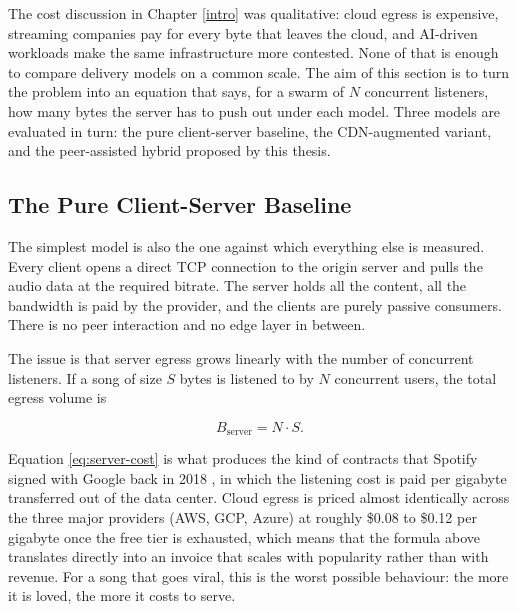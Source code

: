 \indent \par The cost discussion in Chapter \ref{intro} was qualitative: cloud egress is expensive, streaming companies pay for every byte that leaves the cloud, and AI-driven workloads make the same infrastructure more contested. None of that is enough to compare delivery models on a common scale. The aim of this section is to turn the problem into an equation that says, for a swarm of $N$ concurrent listeners, how many bytes the server has to push out under each model. Three models are evaluated in turn: the pure client-server baseline, the CDN-augmented variant, and the peer-assisted hybrid proposed by this thesis.

\subsection{The Pure Client-Server Baseline}
\label{subsec:client-server}

\indent \par The simplest model is also the one against which everything else is measured. Every client opens a direct TCP connection to the origin server and pulls the audio data at the required bitrate. The server holds all the content, all the bandwidth is paid by the provider, and the clients are purely passive consumers. There is no peer interaction and no edge layer in between.

\par The issue is that server egress grows linearly with the number of concurrent listeners. If a song of size $S$ bytes is listened to by $N$ concurrent users, the total egress volume is

\begin{equation}
  B_{\text{server}} = N \cdot S.
  \label{eq:server-cost}
\end{equation}

\par Equation \eqref{eq:server-cost} is what produces the kind of contracts that Spotify signed with Google back in 2018 \cite{spotify_google}, in which the listening cost is paid per gigabyte transferred out of the data center. Cloud egress is priced almost identically across the three major providers (AWS, GCP, Azure) at roughly \$0.08 to \$0.12 per gigabyte once the free tier is exhausted, which means that the formula above translates directly into an invoice that scales with popularity rather than with revenue. For a song that goes viral, this is the worst possible behaviour: the more it is loved, the more it costs to serve.

